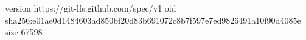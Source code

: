 version https://git-lfs.github.com/spec/v1
oid sha256:e01ae0d1484603ad850bf20d83b691072c8b7f597e7ed9826491a10f90d4085e
size 67598
